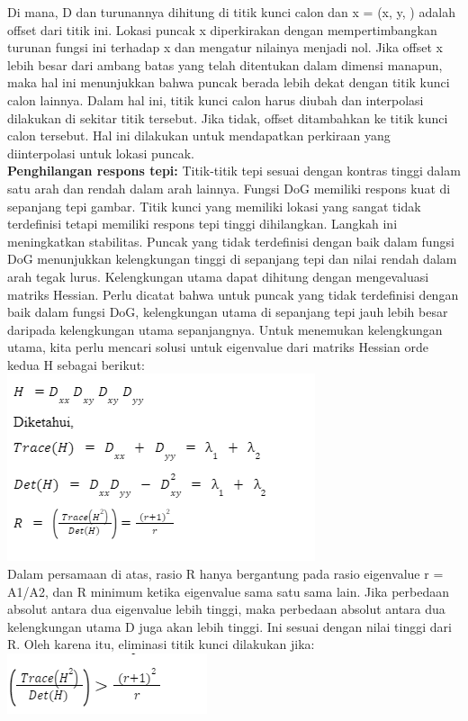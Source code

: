 \documentclass[
  letterpaper,
  DIV=11,
  numbers=noendperiod]{scrreprt}
\begin{document}
Di mana, D dan turunannya dihitung di titik kunci calon dan x = (x, y, )
adalah offset dari titik ini. Lokasi puncak x diperkirakan dengan
mempertimbangkan turunan fungsi ini terhadap x dan mengatur nilainya
menjadi nol. Jika offset x lebih besar dari ambang batas yang telah
ditentukan dalam dimensi manapun, maka hal ini menunjukkan bahwa puncak
berada lebih dekat dengan titik kunci calon lainnya. Dalam hal ini,
titik kunci calon harus diubah dan interpolasi dilakukan di sekitar
titik tersebut. Jika tidak, offset ditambahkan ke titik kunci calon
tersebut. Hal ini dilakukan untuk mendapatkan perkiraan yang
diinterpolasi untuk lokasi puncak.\\
\textbf{Penghilangan respons tepi:} Titik-titik tepi sesuai dengan
kontras tinggi dalam satu arah dan rendah dalam arah lainnya. Fungsi DoG
memiliki respons kuat di sepanjang tepi gambar. Titik kunci yang
memiliki lokasi yang sangat tidak terdefinisi tetapi memiliki respons
tepi tinggi dihilangkan. Langkah ini meningkatkan stabilitas. Puncak
yang tidak terdefinisi dengan baik dalam fungsi DoG menunjukkan
kelengkungan tinggi di sepanjang tepi dan nilai rendah dalam arah tegak
lurus. Kelengkungan utama dapat dihitung dengan mengevaluasi matriks
Hessian. Perlu dicatat bahwa untuk puncak yang tidak terdefinisi dengan
baik dalam fungsi DoG, kelengkungan utama di sepanjang tepi jauh lebih
besar daripada kelengkungan utama sepanjangnya. Untuk menemukan
kelengkungan utama, kita perlu mencari solusi untuk eigenvalue dari
matriks Hessian orde kedua H sebagai berikut:\\
\includegraphics{Asset/image112.png}\\
Dalam persamaan di atas, rasio R hanya bergantung pada rasio eigenvalue
r = A1/A2, dan R minimum ketika eigenvalue sama satu sama lain. Jika
perbedaan absolut antara dua eigenvalue lebih tinggi, maka perbedaan
absolut antara dua kelengkungan utama D juga akan lebih tinggi. Ini
sesuai dengan nilai tinggi dari R. Oleh karena itu, eliminasi titik
kunci dilakukan jika:\\
\includegraphics{Asset/image113.png}
\end{document}
